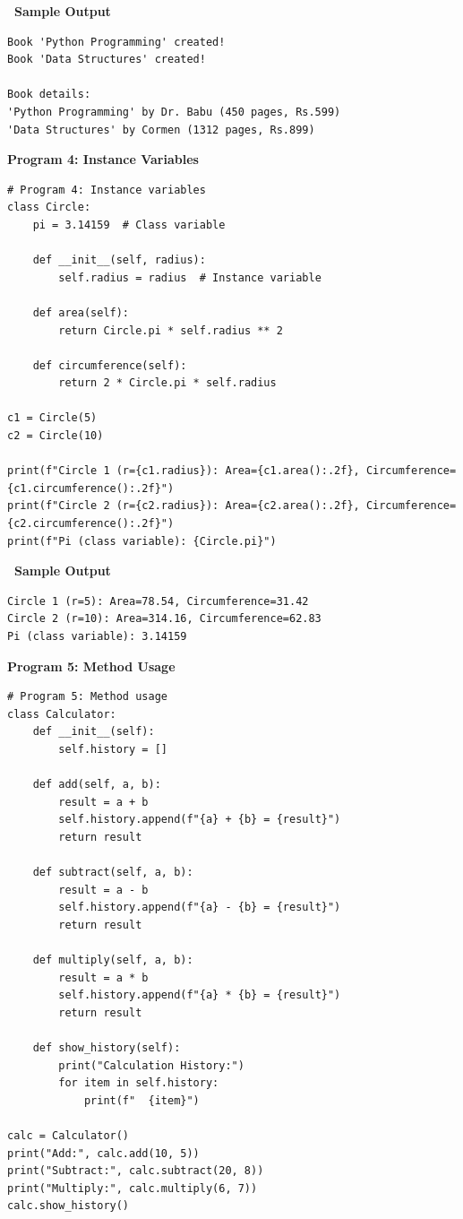 \documentclass[12pt,a4paper]{article}
\newcommand{\outhead}{\noindent\colorbox{cmrgreen!25}%
  {\textbf{\small\color{cmrdark}~Sample Output~}}\par\vspace{-1pt}}
\begin{document}
\outhead
\begin{lstlisting}[style=outputstyle]
Book 'Python Programming' created!
Book 'Data Structures' created!

Book details:
'Python Programming' by Dr. Babu (450 pages, Rs.599)
'Data Structures' by Cormen (1312 pages, Rs.899)
\end{lstlisting}

\vspace{0.5cm}

\textbf{Program 4: Instance Variables}

\begin{lstlisting}
# Program 4: Instance variables
class Circle:
    pi = 3.14159  # Class variable

    def __init__(self, radius):
        self.radius = radius  # Instance variable

    def area(self):
        return Circle.pi * self.radius ** 2

    def circumference(self):
        return 2 * Circle.pi * self.radius

c1 = Circle(5)
c2 = Circle(10)

print(f"Circle 1 (r={c1.radius}): Area={c1.area():.2f}, Circumference={c1.circumference():.2f}")
print(f"Circle 2 (r={c2.radius}): Area={c2.area():.2f}, Circumference={c2.circumference():.2f}")
print(f"Pi (class variable): {Circle.pi}")
\end{lstlisting}

\outhead
\begin{lstlisting}[style=outputstyle]
Circle 1 (r=5): Area=78.54, Circumference=31.42
Circle 2 (r=10): Area=314.16, Circumference=62.83
Pi (class variable): 3.14159
\end{lstlisting}

\vspace{0.5cm}

\textbf{Program 5: Method Usage}

\begin{lstlisting}
# Program 5: Method usage
class Calculator:
    def __init__(self):
        self.history = []

    def add(self, a, b):
        result = a + b
        self.history.append(f"{a} + {b} = {result}")
        return result

    def subtract(self, a, b):
        result = a - b
        self.history.append(f"{a} - {b} = {result}")
        return result

    def multiply(self, a, b):
        result = a * b
        self.history.append(f"{a} * {b} = {result}")
        return result

    def show_history(self):
        print("Calculation History:")
        for item in self.history:
            print(f"  {item}")

calc = Calculator()
print("Add:", calc.add(10, 5))
print("Subtract:", calc.subtract(20, 8))
print("Multiply:", calc.multiply(6, 7))
calc.show_history()
\end{lstlisting}
\end{document}
